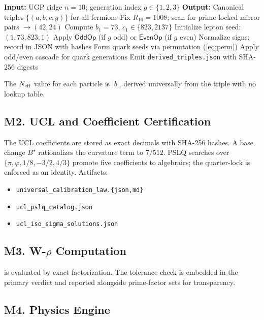 \documentclass[11pt]{article}
\theoremstyle{remark}
\begin{document}
\begin{algorithm}[H]
\caption{UGP$\rightarrow$GTE triple generation}
\label{alg:gte}
\begin{algorithmic}[1]
\State \textbf{Input:} UGP ridge $n{=}10$; generation index $g \in \{1,2,3\}$
\State \textbf{Output:} Canonical triples $\{(a,b,c;g)\}$ for all fermions
\State Fix $R_{10} = 1008$; scan for prime-locked mirror pairs $\to (42,24)$
\State Compute $b_1 = 73$, $c_1 \in \{823, 2137\}$
\State Initialize lepton seed: $(1, 73, 823; 1)$
  \State Apply $\mathsf{OddOp}$ (if $g$ odd) or $\mathsf{EvenOp}$ (if $g$ even)
  \State Normalize signs; record in JSON with hashes
\EndFor
\State Form quark seeds via permutation (\cref{eq:perm})
\State Apply odd/even cascade for quark generations
\State Emit \texttt{derived\_triples.json} with SHA-256 digests
\end{algorithmic}
\end{algorithm}

The $N_{\rm eff}$ value for each particle is $|b|$, derived universally from the triple with no lookup table.

\subsection*{M2. UCL and Coefficient Certification}

The UCL coefficients are stored as exact decimals with SHA-256 hashes.
A base change $B^\star$ rationalizes the curvature term to $7/512$.
PSLQ searches over $\{\pi, \varphi, 1/8, -3/2, 4/3\}$ promote five coefficients to algebraics; the quarter-lock is enforced as an identity.
Artifacts:
\begin{itemize}[leftmargin=1em,itemsep=0pt,parsep=0pt]
\item \texttt{universal\_calibration\_law.\{json,md\}}
\item \texttt{ucl\_pslq\_catalog.json}
\item \texttt{ucl\_iso\_sigma\_solutions.json}
\end{itemize}

\subsection*{M3. W-$\rho$ Computation}

 is evaluated by exact factorization.
The tolerance check is embedded in the primary verdict and reported alongside prime-factor sets for transparency.

\subsection*{M4. Physics Engine}
\end{document}
